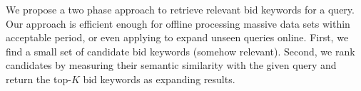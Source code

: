 

We propose a two phase approach to retrieve relevant bid
keywords for a query.  Our approach is efficient enough for offline processing
massive data sets within acceptable period, or even applying to expand
unseen queries online.
First, we find a small set of candidate bid keywords (somehow relevant).  Second, we rank candidates by measuring their semantic similarity with the given query and return the top-$K$ bid keywords as expanding results.


